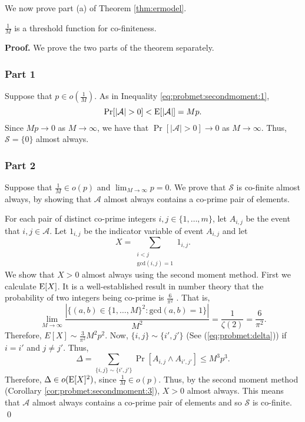 We now prove part (a) of Theorem \ref{thm:ermodel}.

\begin{theorem}\label{thm:ermodel:co-finite}
     $\frac{1}{M}$ is a threshold function for co-finiteness.
\end{theorem}

\textbf{Proof. } We prove the two parts of the theorem separately. 
\subsubsection*{Part 1}
Suppose that $p \in o\left(\frac{1}{M}\right)$. As in Inequality \ref{eq:probmet:secondmoment:1}, 
\[\mathrm{Pr}[|\mathcal{A}| > 0] < \mathrm{E}[|\mathcal{A}|] = Mp.\]
Since $Mp \to 0$ as $M \to \infty$, we have that $\Pr[|\mathcal{A}| > 0] \to 0$ as $M \to \infty$. Thus, $\mathcal{S} = \{0\}$ almost always. \par

\subsubsection*{Part 2}
Suppose that $\frac{1}{M} \in o(p)$ and $\lim_{M \to \infty} p = 0$. We prove that $\mathcal{S}$ is co-finite almost always, by showing that $\mathcal{A}$ almost always contains a co-prime pair of elements. \par
For each pair of distinct co-prime integers $i, j \in \{1,\ldots, m\}$, let $A_{i, j}$ be the event that $i, j \in \mathcal{A}$. Let $1_{i, j}$ be the indicator variable of event $A_{i, j}$ and let 
\[X = \sum_{\substack{i < j \\ \mathrm{gcd}(i, j) = 1}} 1_{i, j}.\]
We show that $X > 0$ almost always using the second moment method. First we calculate $\mathrm{E}[X]$. It is a well-established result in number theory that the probability of two integers being co-prime is $\frac{6}{\pi^2}$ \cite[Theorem 332]{hardy1979introduction}. That is,
\[\lim_{M \to \infty} \frac{|\{(a, b) \in \{1, \ldots, M\}^2: \mathrm{gcd}(a, b) = 1\}|}{M^2} = \frac{1}{\zeta(2)} =\frac{6}{\pi^2}.\]
Therefore, $E[X] \sim \frac{3}{\pi^2}M^2p^2$. Now, $\{i, j\} \sim \{i', j'\}$ (See (\ref{eq:probmet:delta})) if $i = i'$ and $j \neq j'$. Thus,
\[\Delta = \sum_{\{i, j\} \sim \{i', j'\}}\Pr[A_{i, j}\land A_{i', j'}] \leq M^3p^3.\]
Therefore, $\Delta \in o(\mathrm{E}[X]^2)$, since $\frac{1}{M} \in o(p)$. Thus, by the second moment method (Corollary \ref{cor:probmet:secondmoment:3}), $X > 0$ almost always. This means that $\mathcal{A}$ almost always contains a co-prime pair of elements and so $\mathcal{S}$ is co-finite. \qed \par

